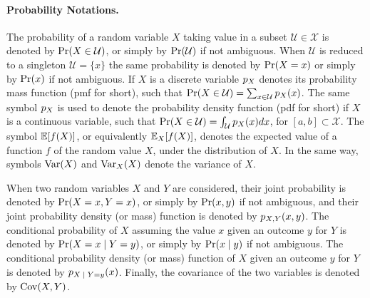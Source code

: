 \paragraph*{Probability Notations.}
The probability of a random variable $X$ taking value in a subset $\mathcal{U}\in\mathcal{X}$ is denoted by $\mathrm{Pr}(X\in\mathcal{U})$, or simply by $\mathrm{Pr}(\mathcal{U})$ if not ambiguous. When $\mathcal{U}$ is reduced to a singleton $\mathcal{U}=\{x\}$ the same probability is denoted by $\mathrm{Pr}(X=x)$ or simply by $\mathrm{Pr}(x)$ if not ambiguous. If $X$ is a discrete variable $p_X$ denotes its probability mass function (pmf for short), such that $\mathrm{Pr}(X\in\mathcal{U})=\sum_{x\in \mathcal{U}}p_X(x)$. The same symbol $p_X$ is used to denote the probability density function (pdf for short) if $X$ is a continuous variable, such that $\mathrm{Pr}(X\in \mathcal{U}) = \int_{\mathcal{U}}p_X(x)dx$, for $[a,b]\subset\mathcal{X}$. 
The symbol $\mathbb{E}[f(X)]$, or equivalently $\mathbb{E}_X[f(X)]$, denotes the expected value of a function $f$ of the random value $X$, under the distribution of $X$. In the same way, symbols $\mathrm{Var}(X)$ and $\mathrm{Var}_X(X)$ denote the variance of $X$.

When two random variables $X$ and $Y$ are considered, their joint probability is denoted by $\mathrm{Pr}(X=x,Y=x)$, or simply by $\mathrm{Pr}(x,y)$ if not ambiguous, and their joint probability density (or mass) function is denoted by $p_{X,Y}(x,y)$. The conditional probability of $X$ assuming the value $x$ given an outcome $y$ for $Y$ is denoted by $\prob (\given{X=x}{Y=y})$, or simply by $\prob(\given{x}{y})$ if not ambiguous. The conditional probability density (or mass) function of $X$ given an outcome $y$ for $Y$ is denoted by $\pdf_{\given{X} {Y=y}}(x)$. Finally, the covariance of the two variables is denoted by $\mathrm{Cov}(X,Y)$.\\


